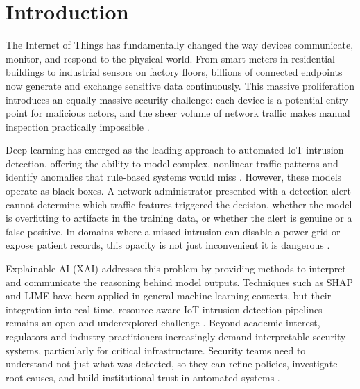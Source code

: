 \documentclass[a4paper,fleqn]{cas-dc}
\numberwithin{equation}{section}
\begin{document}
\maketitle

\section{Introduction}

The Internet of Things has fundamentally changed the way devices communicate, monitor, and respond to the physical world. From smart meters in residential buildings to industrial sensors on factory floors, billions of connected endpoints now generate and exchange sensitive data continuously. This massive proliferation introduces an equally massive security challenge: each device is a potential entry point for malicious actors, and the sheer volume of network traffic makes manual inspection practically impossible \cite{nguyen2022explainable, siganos2023explainable}.

Deep learning has emerged as the leading approach to automated IoT intrusion detection, offering the ability to model complex, nonlinear traffic patterns and identify anomalies that rule-based systems would miss \cite{saheed2022explainable, chen2022explainable}. However, these models operate as black boxes. A network administrator presented with a detection alert cannot determine which traffic features triggered the decision, whether the model is overfitting to artifacts in the training data, or whether the alert is genuine or a false positive. In domains where a missed intrusion can disable a power grid or expose patient records, this opacity is not just inconvenient it is dangerous \cite{das2023trustworthy, zolanvari2021transparent}.

Explainable AI (XAI) addresses this problem by providing methods to interpret and communicate the reasoning behind model outputs. Techniques such as SHAP and LIME have been applied in general machine learning contexts, but their integration into real-time, resource-aware IoT intrusion detection pipelines remains an open and underexplored challenge \cite{ieee2024limeshap, frontiers2025ids}. Beyond academic interest, regulators and industry practitioners increasingly demand interpretable security systems, particularly for critical infrastructure. Security teams need to understand not just what was detected, so they can refine policies, investigate root causes, and build institutional trust in automated systems \cite{ijcrt2025threat, mdpi2025industry5}.
\end{document}

